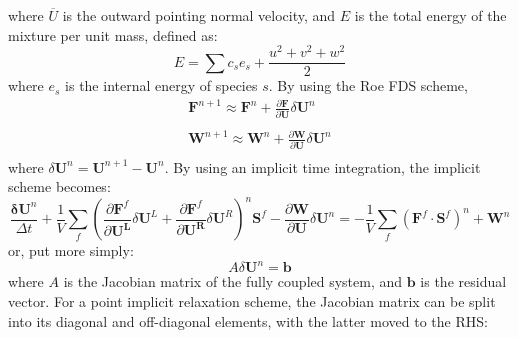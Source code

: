 where $\overline{U}$ is the outward pointing normal velocity, and $E$ is
the total energy of the mixture per unit mass, defined as: 
\begin{equation} E = \sum{c_s e_s}
   + \frac{u^2+v^2+w^2}{2} 
\end{equation}
where $e_s$ is the internal energy of species $s$.  By using the Roe FDS scheme,
\begin{equation}
	\begin{matrix}
		\mathbf{F}^{n+1} \approx \mathbf{F}^n+\frac{\partial \mathbf{F}}{\partial \mathbf{U}}\delta\mathbf{U}^n \\
		\\
		\mathbf{W}^{n+1} \approx \mathbf{W}^n+\frac{\partial \mathbf{W}}{\partial \mathbf{U}}\delta\mathbf{U}^n \\
	\end{matrix}
\end{equation}
where $\delta\mathbf{U}^n = \mathbf{U}^{n+1}- \mathbf{U}^{n}$.  By using an implicit time integration, the implicit scheme becomes:
\begin{equation}
	\frac{\mathbf{\delta U}^n}{\Delta t}+\frac{1}{V}\sum\limits_{f}(\frac{\partial \mathbf{F}^f}{\partial \mathbf{U^L}}\delta\mathbf{U}^L
	+\frac{\partial \mathbf{F}^f}{\partial \mathbf{U^R}}\delta\mathbf{U}^R)^n \mathbf{S}^f
	- \frac{\partial \mathbf{W}}{\partial \mathbf{U}}\delta\mathbf{U}^n
	= -\frac{1}{V}\sum\limits_{f}(\mathbf{F}^f\cdot\mathbf{S}^f)^n + \mathbf{W}^n
\end {equation}
%
or, put more simply:
%
\begin{equation}
	A\delta\mathbf{U}^n = \mathbf{b}
\end{equation}
where $A$ is the Jacobian matrix of the fully coupled system, and $\mathbf{b}$
is the residual vector.  For a point implicit relaxation scheme, the Jacobian
matrix can be split into its diagonal and off-diagonal elements, with the latter
moved to the RHS:
